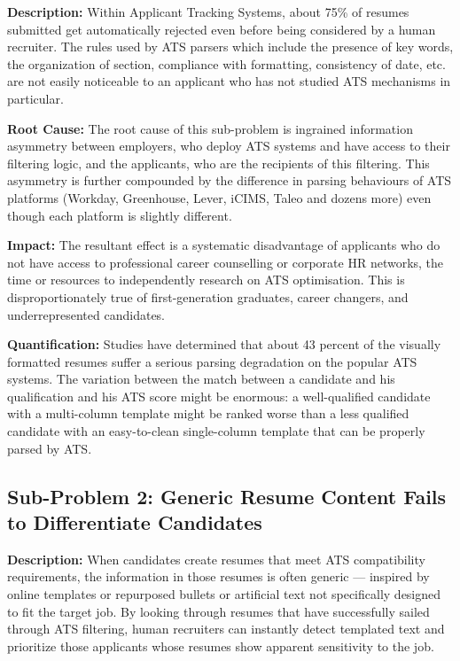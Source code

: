 \documentclass[12pt, a4paper, oneside]{report}
\begin{document}
\textbf{Description:} Within Applicant Tracking Systems, about 75\% of resumes submitted get automatically rejected even before being considered by a human recruiter\cite{jobscan2021}. The rules used by ATS parsers which include the presence of key words, the organization of section, compliance with formatting, consistency of date, etc. are not easily noticeable to an applicant who has not studied ATS mechanisms in particular.

\textbf{Root Cause:} The root cause of this sub-problem is ingrained information asymmetry between employers, who deploy ATS systems and have access to their filtering logic, and the applicants, who are the recipients of this filtering. This asymmetry is further compounded by the difference in parsing behaviours of ATS platforms (Workday, Greenhouse, Lever, iCIMS, Taleo and dozens more) even though each platform is slightly different\cite{resumeworded2022}.

\textbf{Impact:} The resultant effect is a systematic disadvantage of applicants who do not have access to professional career counselling or corporate HR networks, the time or resources to independently research on ATS optimisation\cite{topresume2021}. This is disproportionately true of first-generation graduates, career changers, and underrepresented candidates.

\textbf{Quantification:} Studies have determined that about 43 percent of the visually formatted resumes suffer a serious parsing degradation on the popular ATS systems. The variation between the match between a candidate and his qualification and his ATS score might be enormous: a well-qualified candidate with a multi-column template might be ranked worse than a less qualified candidate with an easy-to-clean single-column template that can be properly parsed by ATS\cite{resumeworded2022}.

\subsection{Sub-Problem 2: Generic Resume Content Fails to Differentiate Candidates}

\textbf{Description:} When candidates create resumes that meet ATS compatibility requirements, the information in those resumes is often generic --- inspired by online templates or repurposed bullets or artificial text not specifically designed to fit the target job. By looking through resumes that have successfully sailed through ATS filtering, human recruiters can instantly detect templated text and prioritize those applicants whose resumes show apparent sensitivity to the job.
\end{document}
